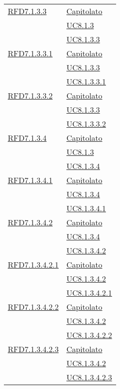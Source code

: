 \begin{longtable}{|>{\centering}m{5cm}|m{5cm}<{\centering}|}
\hyperlink{RFD7.1.3.3}{RFD7.1.3.3} & \hyperlink{Capitolato}{Capitolato}\\
& \hyperref[UC8.1.3]{UC8.1.3}\\
& \hyperref[UC8.1.3.3]{UC8.1.3.3}\\ \hline

\hyperlink{RFD7.1.3.3.1}{RFD7.1.3.3.1} & \hyperlink{Capitolato}{Capitolato}\\
& \hyperref[UC8.1.3.3]{UC8.1.3.3}\\
& \hyperref[UC8.1.3.3.1]{UC8.1.3.3.1}\\ \hline

\hyperlink{RFD7.1.3.3.2}{RFD7.1.3.3.2} & \hyperlink{Capitolato}{Capitolato}\\
& \hyperref[UC8.1.3.3]{UC8.1.3.3}\\
& \hyperref[UC8.1.3.3.2]{UC8.1.3.3.2}\\ \hline

\hyperlink{RFD7.1.3.4}{RFD7.1.3.4} & \hyperlink{Capitolato}{Capitolato}\\
& \hyperref[UC8.1.3]{UC8.1.3}\\
& \hyperref[UC8.1.3.4]{UC8.1.3.4}\\ \hline

\hyperlink{RFD7.1.3.4.1}{RFD7.1.3.4.1} & \hyperlink{Capitolato}{Capitolato}\\
& \hyperref[UC8.1.3.4]{UC8.1.3.4}\\
& \hyperref[UC8.1.3.4.1]{UC8.1.3.4.1}\\ \hline

\hyperlink{RFD7.1.3.4.2}{RFD7.1.3.4.2} & \hyperlink{Capitolato}{Capitolato}\\
& \hyperref[UC8.1.3.4]{UC8.1.3.4}\\
& \hyperref[UC8.1.3.4.2]{UC8.1.3.4.2}\\ \hline

\hyperlink{RFD7.1.3.4.2.1}{RFD7.1.3.4.2.1} & \hyperlink{Capitolato}{Capitolato}\\
& \hyperref[UC8.1.3.4.2]{UC8.1.3.4.2}\\
& \hyperref[UC8.1.3.4.2.1]{UC8.1.3.4.2.1}\\ \hline

\hyperlink{RFD7.1.3.4.2.2}{RFD7.1.3.4.2.2} & \hyperlink{Capitolato}{Capitolato}\\
& \hyperref[UC8.1.3.4.2]{UC8.1.3.4.2}\\
& \hyperref[UC8.1.3.4.2.2]{UC8.1.3.4.2.2}\\ \hline

\hyperlink{RFD7.1.3.4.2.3}{RFD7.1.3.4.2.3} & \hyperlink{Capitolato}{Capitolato}\\
& \hyperref[UC8.1.3.4.2]{UC8.1.3.4.2}\\
& \hyperref[UC8.1.3.4.2.3]{UC8.1.3.4.2.3}\\ \hline


\end{longtable}
